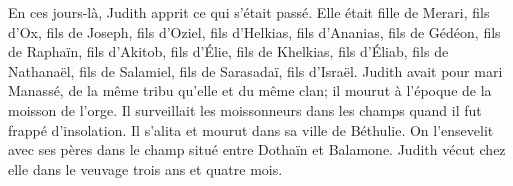 En ces jours-là, Judith apprit ce qui s’était passé.
Elle était fille de Merari, fils d’Ox, fils de Joseph, fils d’Oziel,
	fils d’Helkias, fils d’Ananias, fils de Gédéon, fils de Raphaïn,
	fils d’Akitob, fils d’Élie, fils de Khelkias, fils d’Éliab,
	fils de Nathanaël, fils de Salamiel, fils de Sarasadaï, fils d’Israël.
Judith avait pour mari Manassé, de la même tribu qu’elle et du même clan;
	il mourut à l’époque de la moisson de l’orge.
Il surveillait les moissonneurs dans les champs quand il fut frappé d’insolation.
	Il s’alita et mourut dans sa ville de Béthulie.
	On l’ensevelit avec ses pères dans le champ situé entre Dothaïn et Balamone.
Judith vécut chez elle dans le veuvage trois ans et quatre mois.
